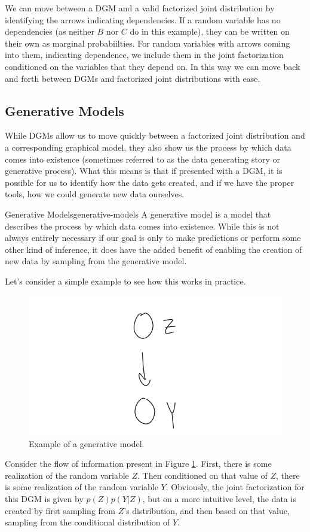 We can move between a DGM and a valid factorized joint distribution by identifying the arrows indicating dependencies. If a random variable has no dependencies (as neither $B$ nor $C$ do in this example), they can be written on their own as marginal probabiilties. For random variables with arrows coming into them, indicating dependence, we include them in the joint factorization conditioned on the variables that they depend on. In this way we can move back and forth between DGMs and factorized joint distributions with ease.

\subsection{Generative Models}
While DGMs allow us to move quickly between a factorized joint distribution and a corresponding graphical model, they also show us the process by which data comes into existence (sometimes referred to as the data generating story or generative process). What this means is that if presented with a DGM, it is possible for us to identify how the data gets created, and if we have the proper tools, how we could generate new data ourselves.

\begin{definition}{Generative Models}{generative-models}
    A generative model is a model that describes the process by which data comes into existence. While this is not always entirely necessary if our goal is only to make predictions or perform some other kind of inference, it does have the added benefit of enabling the creation of new data by sampling from the generative model.
\end{definition}

Let's consider a simple example to see how this works in practice.
\begin{figure}
    \centering
    \includegraphics[width=0.5\paperwidth]{../GraphicalModels/fig/GenerativeRVExample.png}
    \caption{Example of a generative model.}
    \label{fig:generative-rv}
\end{figure}
Consider the flow of information present in Figure \ref{fig:generative-rv}. First, there is some realization of the random variable $Z$. Then conditioned on that value of $Z$, there is some realization of the random variable $Y$. Obviously, the joint factorization for this DGM is given by $p(Z)p(Y|Z)$, but on a more intuitive level, the data is created by first sampling from $Z$'s distribution, and then based on that value, sampling from the conditional distribution of $Y$.

